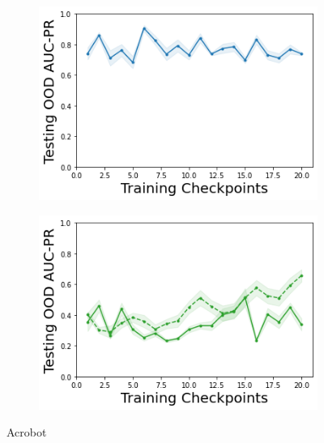\begin{figure}
\begin{subfigure}{.24\textwidth}
    \end{subfigure}
    \begin{subfigure}{.24\textwidth}
        \includegraphics[width=\textwidth]{sections/011_icml2022/resources/DKL-AcrobotOOD-v0-AUC-PR-out-epistemic_-testing-strategy.png}
    \end{subfigure}
    \begin{subfigure}{.24\textwidth}
        \includegraphics[width=\textwidth]{sections/011_icml2022/resources/PostNet-AcrobotOOD-v0-AUC-PR-out-epistemic_-testing-strategy.png}
    \end{subfigure}
    \vspace{-3mm}
    \caption*{Acrobot}
    \vspace{2mm}
    

\end{figure}
